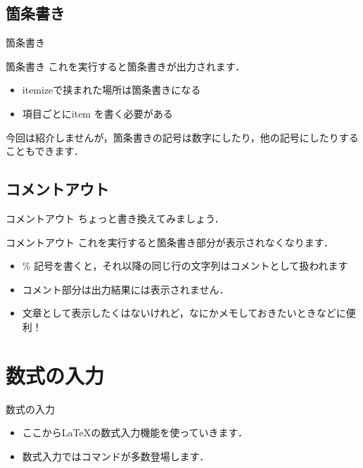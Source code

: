 \documentclass[slide,dvipdfmx]{beamer}
\newcommand{\bs}{\texttt{\symbol{"5C}}}
\begin{document}
\subsection{箇条書き}
\begin{frame}{箇条書き}

\end{frame}

\begin{frame}{箇条書き}
これを実行すると箇条書きが出力されます．
\begin{itemize}
\item itemizeで挟まれた場所は箇条書きになる
\item 項目ごとに\bs item を書く必要がある
\end{itemize}
今回は紹介しませんが，箇条書きの記号は数字にしたり，他の記号にしたりすることもできます．
\end{frame}


\subsection{コメントアウト}
\begin{frame}{コメントアウト}
ちょっと書き換えてみましょう．

\end{frame}
\begin{frame}{コメントアウト}
これを実行すると箇条書き部分が表示されなくなります．
\begin{itemize}
\item \% 記号を書くと，それ以降の同じ行の文字列はコメントとして扱われます
\item コメント部分は出力結果には表示されません．
\item 文章として表示したくはないけれど，なにかメモしておきたいときなどに便利！
\end{itemize}
\end{frame}

\section{数式の入力}
\begin{frame}{数式の入力}

\begin{itemize}
\item ここから\LaTeX の数式入力機能を使っていきます．
\item 数式入力ではコマンドが多数登場します．
\end{itemize}
\end{frame}
\end{document}
